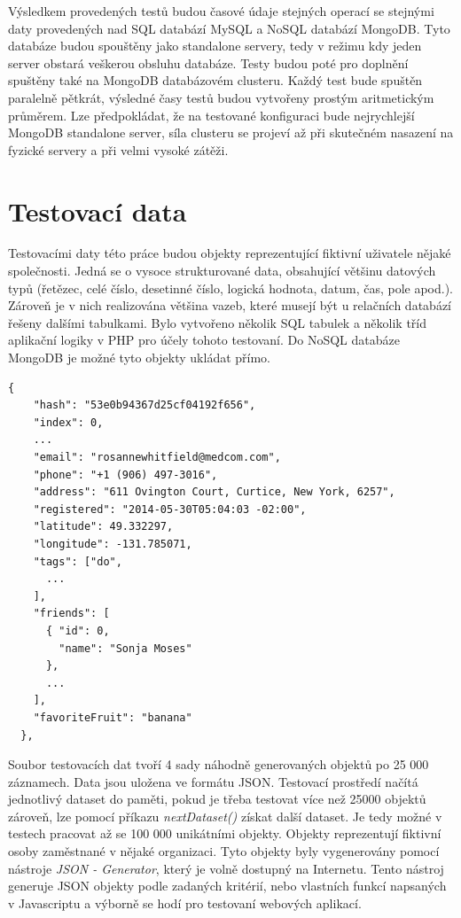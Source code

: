 Výsledkem provedených testů budou časové údaje stejných operací se stejnými daty provedených nad SQL databází MySQL a NoSQL databází MongoDB. Tyto databáze budou spouštěny jako standalone servery, tedy v režimu kdy jeden server obstará veškerou obsluhu databáze. Testy budou poté pro doplnění spuštěny také na MongoDB databázovém clusteru. Každý test bude spuštěn paralelně pětkrát, výsledné časy testů budou vytvořeny prostým aritmetickým průměrem.
Lze předpokládat, že na testované konfiguraci bude nejrychlejší MongoDB standalone server, síla clusteru se projeví až při skutečném nasazení na fyzické servery a při velmi vysoké zátěži.

\section{Testovací data}
Testovacími daty této práce budou objekty reprezentující fiktivní uživatele nějaké společnosti.
Jedná se o vysoce strukturované data, obsahující většinu datových typů (řetězec, celé číslo, desetinné číslo, logická hodnota, datum, čas, pole apod.). Zároveň je v nich realizována většina vazeb, které musejí být u relačních databází řešeny dalšími tabulkami. Bylo vytvořeno několik SQL tabulek a několik tříd aplikační logiky v PHP pro účely tohoto testovaní. Do NoSQL databáze MongoDB je možné tyto objekty ukládat přímo.

\begin{lstlisting}[caption={Ukázka objektu testovacích dat (zkráceno)}]
  {
    "hash": "53e0b94367d25cf04192f656",
    "index": 0,
	...
    "email": "rosannewhitfield@medcom.com",
    "phone": "+1 (906) 497-3016",
    "address": "611 Ovington Court, Curtice, New York, 6257",
    "registered": "2014-05-30T05:04:03 -02:00",
    "latitude": 49.332297,
    "longitude": -131.785071,
    "tags": ["do",
	  ...
    ],
    "friends": [
      { "id": 0,
        "name": "Sonja Moses"
      },
	  ...
    ],
    "favoriteFruit": "banana"
  },
\end{lstlisting}
Soubor testovacích dat tvoří 4 sady náhodně generovaných objektů po 25 000 záznamech. Data jsou uložena ve formátu JSON. Testovací prostředí načítá jednotlivý dataset do paměti, pokud je třeba testovat více než 25000 objektů zároveň, lze pomocí příkazu \emph{nextDataset()} získat další dataset. Je tedy možné v testech pracovat až se 100 000 unikátními objekty. Objekty reprezentují fiktivní osoby zaměstnané v nějaké organizaci. Tyto objekty byly vygenerovány pomocí nástroje \emph{JSON - Generator}, který je volně dostupný na Internetu. Tento nástroj generuje JSON objekty podle zadaných kritérií, nebo vlastních funkcí napsaných v Javascriptu a výborně se hodí pro testovaní webových aplikací. 

